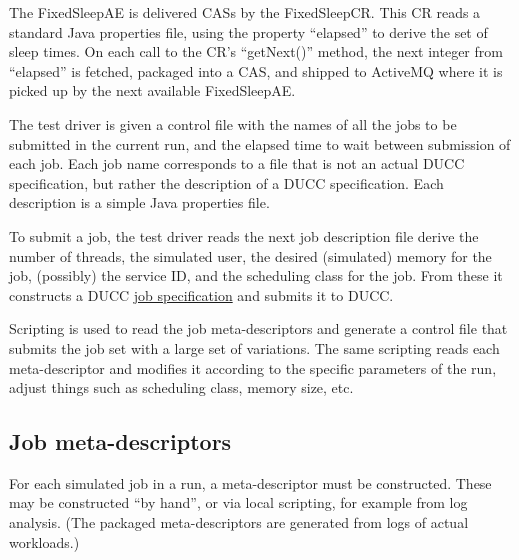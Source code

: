      The FixedSleepAE is delivered CASs by the FixedSleepCR.  This CR reads
     a standard Java properties file, using the property ``elapsed'' to derive the
     set of sleep times.  On each call to the CR's ``getNext()'' method, the next
     integer from ``elapsed'' is fetched, packaged into a CAS, and shipped to
     ActiveMQ where it is picked up by the next available FixedSleepAE.

     The test driver is given a control file with the names of all the jobs to be
     submitted in the current run, and the elapsed time to wait between submission
     of each job. Each job name corresponds to a file that is not an actual
     DUCC specification, but rather the description of a DUCC specification.  Each
     description is a simple Java properties file.

     To submit a job, the test driver reads the next job description file
     derive the number of 
     threads, the simulated user, the desired (simulated) memory for the job,
     (possibly) the service ID, and the scheduling class for the job.  From these
     it constructs a DUCC \hyperref[sec:cli.ducc-submit]{job specification} and submits it to DUCC.

     Scripting is used to read the job meta-descriptors and generate a control
     file that submits the job set with a large set of variations.  The same scripting
     reads each meta-descriptor and modifies it according to the specific parameters
     of the run, adjust things such as scheduling class, memory size, etc.
     
     \subsection{Job meta-descriptors}
     For each simulated job in a run, a meta-descriptor must be constructed.  These may be
     constructed ``by hand'', or via local scripting, for example from log analysis.  (The
     packaged meta-descriptors are generated from logs of actual workloads.)

